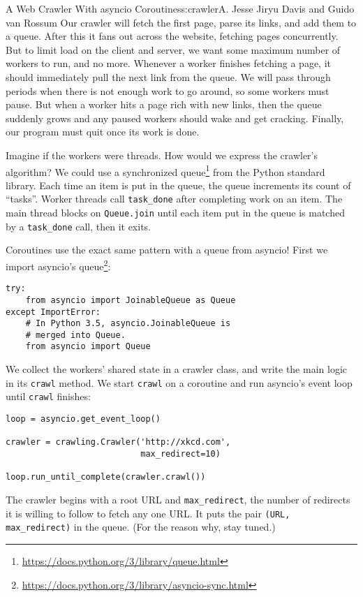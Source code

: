 \begin{aosachapter}{A Web Crawler With asyncio Coroutines}{s:crawler}{A. Jesse Jiryu Davis and Guido van Rossum}
Our crawler will fetch the first page, parse its links, and add them to
a queue. After this it fans out across the website, fetching pages
concurrently. But to limit load on the client and server, we want some
maximum number of workers to run, and no more. Whenever a worker
finishes fetching a page, it should immediately pull the next link from
the queue. We will pass through periods when there is not enough work to
go around, so some workers must pause. But when a worker hits a page
rich with new links, then the queue suddenly grows and any paused
workers should wake and get cracking. Finally, our program must quit
once its work is done.

Imagine if the workers were threads. How would we express the crawler's
algorithm? We could use a synchronized queue\footnote{\url{https://docs.python.org/3/library/queue.html}}
from the Python standard library. Each time an item is put in the queue,
the queue increments its count of ``tasks''. Worker threads call
\texttt{task\_done} after completing work on an item. The main thread
blocks on \texttt{Queue.join} until each item put in the queue is
matched by a \texttt{task\_done} call, then it exits.

Coroutines use the exact same pattern with a queue from asyncio! First
we import asyncio's queue\footnote{\url{https://docs.python.org/3/library/asyncio-sync.html}}:

\begin{verbatim}
try:
    from asyncio import JoinableQueue as Queue
except ImportError:
    # In Python 3.5, asyncio.JoinableQueue is
    # merged into Queue.
    from asyncio import Queue
\end{verbatim}

We collect the workers' shared state in a crawler class, and write the
main logic in its \texttt{crawl} method. We start \texttt{crawl} on a
coroutine and run asyncio's event loop until \texttt{crawl} finishes:

\begin{verbatim}
loop = asyncio.get_event_loop()

crawler = crawling.Crawler('http://xkcd.com',
                           max_redirect=10)

loop.run_until_complete(crawler.crawl())
\end{verbatim}

The crawler begins with a root URL and \texttt{max\_redirect}, the
number of redirects it is willing to follow to fetch any one URL. It
puts the pair \texttt{(URL, max\_redirect)} in the queue. (For the
reason why, stay tuned.)


\end{aosachapter}
